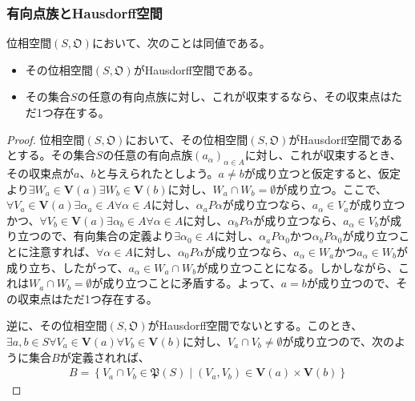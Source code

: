 \documentclass[dvipdfmx]{jsarticle}
\begin{document}
\subsubsection{有向点族とHausdorff空間}%
\begin{thm}\label{8.1.9.15}
位相空間$\left( S,\mathfrak{O} \right)$において、次のことは同値である。
\begin{itemize}
\item
  その位相空間$\left( S,\mathfrak{O} \right)$がHausdorff空間である。
\item
  その集合$S$の任意の有向点族に対し、これが収束するなら、その収束点はただ1つ存在する。
\end{itemize}
\end{thm}
\begin{proof}
位相空間$\left( S,\mathfrak{O} \right)$において、その位相空間$\left( S,\mathfrak{O} \right)$がHausdorff空間であるとする。その集合$S$の任意の有向点族$\left( a_{\alpha} \right)_{\alpha \in A}$に対し、これが収束するとき、その収束点が$a$、$b$と与えられたとしよう。$a \neq b$が成り立つと仮定すると、仮定より$\exists W_{a} \in \mathbf{V}(a)\exists W_{b} \in \mathbf{V}(b)$に対し、$W_{a} \cap W_{b} = \emptyset$が成り立つ。ここで、$\forall V_{a} \in \mathbf{V}(a)\exists\alpha_{a} \in A\forall\alpha \in A$に対し、$\alpha_{a}P\alpha$が成り立つなら、$a_{\alpha} \in V_{a}$が成り立つかつ、$\forall V_{b} \in \mathbf{V}(a)\exists\alpha_{b} \in A\forall\alpha \in A$に対し、$\alpha_{b}P\alpha$が成り立つなら、$a_{\alpha} \in V_{b}$が成り立つので、有向集合の定義より$\exists\alpha_{0} \in A$に対し、$\alpha_{a}P\alpha_{0}$かつ$\alpha_{b}P\alpha_{0}$が成り立つことに注意すれば、$\forall\alpha \in A$に対し、$\alpha_{0}P\alpha$が成り立つなら、$a_{\alpha} \in W_{a}$かつ$a_{\alpha} \in W_{b}$が成り立ち、したがって、$a_{\alpha} \in W_{a} \cap W_{b}$が成り立つことになる。しかしながら、これは$W_{a} \cap W_{b} = \emptyset$が成り立つことに矛盾する。よって、$a = b$が成り立つので、その収束点はただ1つ存在する。\par
逆に、その位相空間$\left( S,\mathfrak{O} \right)$がHausdorff空間でないとする。このとき、$\exists a,b \in S\forall V_{a} \in \mathbf{V}(a)\forall V_{b} \in \mathbf{V}(b)$に対し、$V_{a} \cap V_{b} \neq \emptyset$が成り立つので、次のように集合$B$が定義されれば、
\begin{align*}
B = \left\{ V_{a} \cap V_{b}\in \mathfrak{P}(S) \middle| \left( V_{a},V_{b} \right) \in \mathbf{V}(a) \times \mathbf{V}(b) \right\}
\end{align*}

\end{proof}
\end{document}
